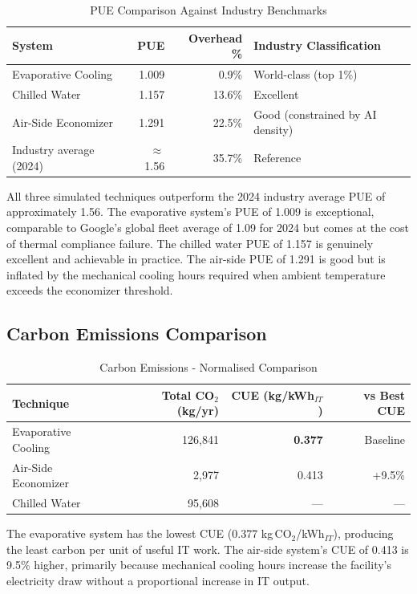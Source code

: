 ﻿\documentclass[12pt,a4paper]{report}
\begin{document}
\begin{table}[H]
\centering
\caption{PUE Comparison Against Industry Benchmarks}
\label{tab:pue_compare}
\renewcommand{\arraystretch}{1.35}
\begin{tabular}{lrrl}
\toprule
\textbf{System} & \textbf{PUE} & \textbf{Overhead \%} & \textbf{Industry Classification} \\
\midrule
Evaporative Cooling & 1.009 & 0.9\% & World-class (top 1\%) \\
Chilled Water & 1.157 & 13.6\% & Excellent \\
Air-Side Economizer & 1.291 & 22.5\% & Good (constrained by AI density) \\
Industry average (2024) & $\approx$1.56 & 35.7\% & Reference \\
\bottomrule
\end{tabular}
\end{table}

\noindent All three simulated techniques outperform the 2024 industry average PUE of
approximately 1.56.
The evaporative system's PUE of 1.009 is exceptional, comparable to Google's global
fleet average of 1.09 for 2024 but comes at the cost of
thermal compliance failure. The chilled water PUE of 1.157 is genuinely excellent and
achievable in practice. The air-side PUE of 1.291 is good but is inflated by the
mechanical cooling hours required when ambient temperature exceeds the economizer threshold.

\subsection{Carbon Emissions Comparison}

\begin{table}[H]
\centering
\caption{Carbon Emissions - Normalised Comparison}
\label{tab:carbon_compare}
\renewcommand{\arraystretch}{1.35}
\begin{tabular}{lrrr}
\toprule
\textbf{Technique} & \textbf{Total CO$_2$ (kg/yr)} & \textbf{CUE (kg/kWh$_{IT}$)} & \textbf{vs Best CUE} \\
\midrule
Evaporative Cooling & 126{,}841 & \textbf{0.377} & Baseline \\
Air-Side Economizer & 2{,}977 & 0.413 & +9.5\% \\
Chilled Water & 95{,}608 & --- & --- \\
\bottomrule
\end{tabular}
\end{table}

\noindent The evaporative system has the lowest CUE (0.377 kg\,CO$_2$/kWh$_{IT}$), producing
the least carbon per unit of useful IT work. The air-side system's CUE of 0.413 is 9.5\%
higher, primarily because mechanical cooling hours increase the facility's electricity
draw without a proportional increase in IT output.
\end{document}
